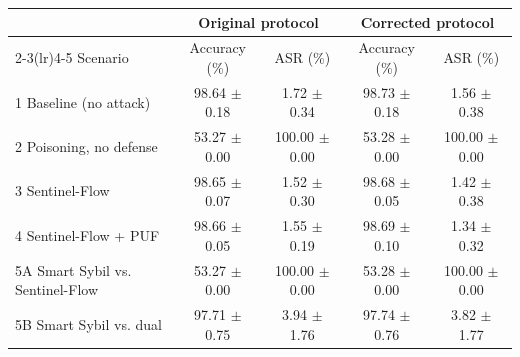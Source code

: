 \begin{tabular}{lcccc}
\toprule
 & \multicolumn{2}{c}{Original protocol} & \multicolumn{2}{c}{Corrected protocol} \\
\cmidrule(lr){2-3}\cmidrule(lr){4-5}
Scenario & Accuracy (\%) & ASR (\%) & Accuracy (\%) & ASR (\%) \\
\midrule
1 Baseline (no attack) & 98.64 $\pm$ 0.18 & 1.72 $\pm$ 0.34 & 98.73 $\pm$ 0.18 & 1.56 $\pm$ 0.38 \\
2 Poisoning, no defense & 53.27 $\pm$ 0.00 & 100.00 $\pm$ 0.00 & 53.28 $\pm$ 0.00 & 100.00 $\pm$ 0.00 \\
3 Sentinel-Flow & 98.65 $\pm$ 0.07 & 1.52 $\pm$ 0.30 & 98.68 $\pm$ 0.05 & 1.42 $\pm$ 0.38 \\
4 Sentinel-Flow + PUF & 98.66 $\pm$ 0.05 & 1.55 $\pm$ 0.19 & 98.69 $\pm$ 0.10 & 1.34 $\pm$ 0.32 \\
5A Smart Sybil vs. Sentinel-Flow & 53.27 $\pm$ 0.00 & 100.00 $\pm$ 0.00 & 53.28 $\pm$ 0.00 & 100.00 $\pm$ 0.00 \\
5B Smart Sybil vs. dual & 97.71 $\pm$ 0.75 & 3.94 $\pm$ 1.76 & 97.74 $\pm$ 0.76 & 3.82 $\pm$ 1.77 \\
\bottomrule
\end{tabular}

